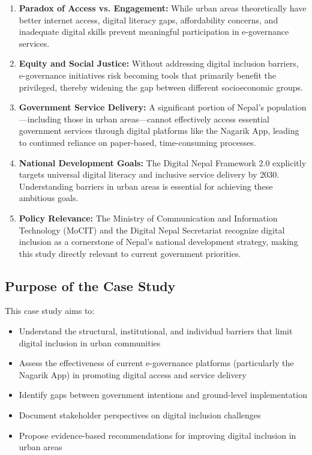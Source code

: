 \documentclass[12pt,a4paper]{article}
\begin{document}
\begin{enumerate}
    \item \textbf{Paradox of Access vs. Engagement:} While urban areas theoretically have better internet access, digital literacy gaps, affordability concerns, and inadequate digital skills prevent meaningful participation in e-governance services.
    
    \item \textbf{Equity and Social Justice:} Without addressing digital inclusion barriers, e-governance initiatives risk becoming tools that primarily benefit the privileged, thereby widening the gap between different socioeconomic groups.
    
    \item \textbf{Government Service Delivery:} A significant portion of Nepal's population—including those in urban areas—cannot effectively access essential government services through digital platforms like the Nagarik App, leading to continued reliance on paper-based, time-consuming processes.
    
    \item \textbf{National Development Goals:} The Digital Nepal Framework 2.0 explicitly targets universal digital literacy and inclusive service delivery by 2030. Understanding barriers in urban areas is essential for achieving these ambitious goals.
    
    \item \textbf{Policy Relevance:} The Ministry of Communication and Information Technology (MoCIT) and the Digital Nepal Secretariat recognize digital inclusion as a cornerstone of Nepal's national development strategy, making this study directly relevant to current government priorities.
\end{enumerate}

\subsection{Purpose of the Case Study}

This case study aims to:
\begin{itemize}
    \item Understand the structural, institutional, and individual barriers that limit digital inclusion in urban communities
    \item Assess the effectiveness of current e-governance platforms (particularly the Nagarik App) in promoting digital access and service delivery
    \item Identify gaps between government intentions and ground-level implementation
    \item Document stakeholder perspectives on digital inclusion challenges
    \item Propose evidence-based recommendations for improving digital inclusion in urban areas
\end{itemize}
\end{document}
